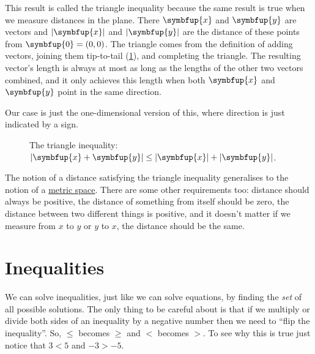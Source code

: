 \documentclass[fleqn]{LectureClass/LectureClass}
\newcommand{\vv}[1]{\symbfup{#1}}
\begin{document}
    \begin{remark}{}{}
        This result is called the triangle inequality because the same result is true when we measure distances in the plane.
        There \(\vv{x}\) and \(\vv{y}\) are vectors and \(\abs{\vv{x}}\) and \(\abs{\vv{y}}\) are the distance of these points from \(\vv{0} = (0, 0)\).
        The triangle comes from the definition of adding vectors, joining them tip-to-tail (\cref{fig:triangle inequality}), and completing the triangle.
        The resulting vector's length is always at most as long as the lengths of the other two vectors combined, and it only achieves this length when both \(\vv{x}\) and \(\vv{y}\) point in the same direction.
        
        Our case is just the one-dimensional version of this, where direction is just indicated by a sign.
    \end{remark}
    
    \begin{figure}[ht]
        \caption[The triangle inequality]{The triangle inequality: \(\abs{\vv{x} + \vv{y}} \le \abs{\vv{x}} + \abs{\vv{y}}\).}
        \label{fig:triangle inequality}
    \end{figure}
    
    \begin{remark}{}{}
        The notion of a distance satisfying the triangle inequality generalises to the notion of a \href{https://en.wikipedia.org/wiki/Metric_space}{metric space}.
        There are some other requirements too: distance should always be positive, the distance of something from itself should be zero, the distance between two different things is positive, and it doesn't matter if we measure from \(x\) to \(y\) or \(y\) to \(x\), the distance should be the same.
    \end{remark}
    
    \section{Inequalities}
    We can solve inequalities, just like we can solve equations, by finding the \emph{set} of all possible solutions.
    The only thing to be careful about is that if we multiply or divide both sides of an inequality by a negative number then we need to \enquote{flip the inequality}.
    So, \(\le\) becomes \(\ge\) and \(<\) becomes \(>\).
    To see why this is true just notice that \(3 < 5\) and \(-3 > -5\).
    
\end{document}
